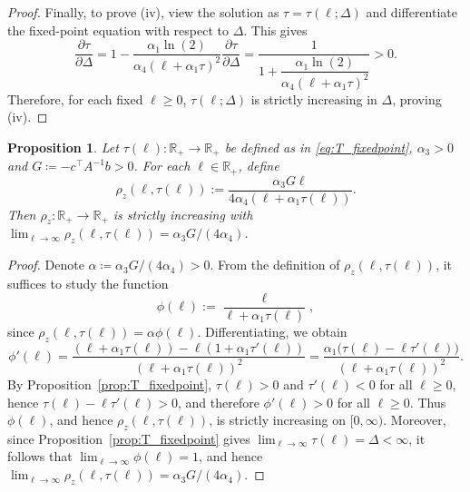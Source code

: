 \documentclass{article}
\newtheorem{proposition}{Proposition}
\begin{document}
\begin{proof}
    Finally, to prove (iv), view the solution as $\tau=\tau(\ell;\Delta)$ and 
    differentiate the fixed-point equation with respect to $\Delta$. This gives
    \begin{equation*}
        \frac{\partial \tau}{\partial \Delta}
        =
        1-
        \frac{\alpha_1\ln(2)}{\alpha_4(\ell+\alpha_1\tau)^2}
        \frac{\partial \tau}{\partial \Delta}
        =
        \frac{1}{
        1+\dfrac{\alpha_1\ln(2)}
        {\alpha_4(\ell+\alpha_1\tau)^2}}
        >0.
    \end{equation*}
    Therefore, for each fixed $\ell\ge0$, $\tau(\ell;\Delta)$ is strictly increasing in $\Delta$, proving (iv).
\end{proof}

\begin{proposition}\label{prop:ell4_monotone}
Let $\tau(\ell):\mathbb{R}_+\to\mathbb{R}_+$ be defined as in 
\eqref{eq:T_fixedpoint}, $\alpha_3>0$ and $G\coloneqq-c^\top A^{-1}b>0$. For each $\ell\in\mathbb{R}_+$, define
\begin{equation*}
    \rho_z(\ell,\tau(\ell))
    := \frac{\alpha_3 G\ell}{4\alpha_4(\ell+\alpha_1\tau(\ell))}.
\end{equation*}
Then $\rho_z:\mathbb{R}_+\to\mathbb{R}_+$ is strictly increasing with 
$\lim_{\ell\to\infty}\rho_z(\ell,\tau(\ell))=\alpha_3G/(4\alpha_4)$.
\end{proposition}

\begin{proof}
Denote
$\alpha \coloneqq \alpha_3 G/(4\alpha_4) > 0$. From the definition of $\rho_z(\ell,\tau(\ell))$, it suffices to study the function
\begin{equation*}
    \phi(\ell):=\frac{\ell}{\ell+\alpha_1\tau(\ell)},
\end{equation*}
since $\rho_z(\ell,\tau(\ell))=\alpha\phi(\ell)$. 
Differentiating, we obtain
\begin{equation*}
    \phi'(\ell)
    =\frac{(\ell+\alpha_1\tau(\ell)) - \ell(1+\alpha_1\tau'(\ell))}
          {(\ell+\alpha_1\tau(\ell))^2}
    =\frac{\alpha_1\bigl(\tau(\ell)-\ell\tau'(\ell)\bigr)}
          {(\ell+\alpha_1\tau(\ell))^2}.
\end{equation*}
By Proposition~\ref{prop:T_fixedpoint}, $\tau(\ell)>0$ and $\tau'(\ell)<0$ 
for all $\ell\ge0$, hence $\tau(\ell)-\ell\tau'(\ell)>0$, and therefore 
$\phi'(\ell)>0$ for all $\ell\ge0$. Thus $\phi(\ell)$, and hence 
$\rho_z(\ell,\tau(\ell))$, is strictly increasing on $[0,\infty)$.
Moreover, since Proposition~\ref{prop:T_fixedpoint} gives 
$\lim_{\ell\to\infty}\tau(\ell)=\Delta<\infty$, it follows that
$\lim_{\ell\to\infty}\phi(\ell)=1$, and hence $\lim_{\ell\to\infty}\rho_z(\ell,\tau(\ell))=\alpha_3G/(4\alpha_4)$.
\end{proof}
\end{document}
